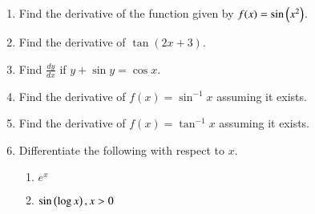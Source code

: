 \begin{enumerate}[label=\arabic*.,ref=\thesubsection.\theenumi]
\item Find the derivative of the function given by $f(x) = \sin\left(x^2\right)$.
\item Find the derivative of $\tan (2x + 3)$.
\item Find $\frac{dy}{dx}$ if $y + \sin y = \cos x$.
\item Find the derivative of $f(x) = \sin ^{-1}x$ assuming it exists.
\item Find the derivative of $f(x) = \tan ^{-1}x$ assuming it exists.
\item Differentiate the following with respect to $x$.
%
\begin{enumerate}
\item  $e^x$
\item  $\sin \left(\log x\right), x > 0$

\end{enumerate}
\end{enumerate}
